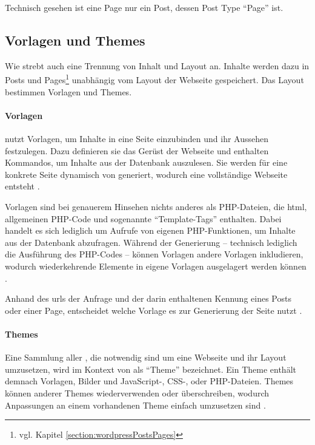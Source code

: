             Technisch gesehen ist eine Page nur ein Post,
            dessen Post Type "`Page"' ist.

        \subsection{Vorlagen und Themes}
            \label{section:wordpressTemplatesThemes}
            Wie {\imperia} strebt auch {\wordpress} eine Trennung von
            Inhalt und Layout an.
            Inhalte werden dazu in
            Posts und Pages\footnote{vgl. Kapitel \ref{section:wordpressPostsPages}}
            unabhängig vom Layout der Webseite gespeichert.
            Das Layout bestimmen Vorlagen und Themes.

            \paragraph*{Vorlagen}
            {\wordpress} nutzt Vorlagen, um Inhalte in eine Seite einzubinden
            und ihr Aussehen festzulegen.
            Dazu definieren sie das Gerüst der Webseite und enthalten Kommandos,
            um Inhalte aus der Datenbank auszulesen.
            Sie werden für eine konkrete Seite dynamisch von {\wordpress} generiert,
            wodurch eine vollständige Webseite entsteht
            \cite{wordpress:Templates}.

            Vorlagen sind bei genauerem Hinsehen nichts anderes als PHP-Dateien,
            die \gls{html}, allgemeinen PHP-Code und sogenannte
            "`Template-Tags"' enthalten.
            Dabei handelt es sich lediglich um Aufrufe von
            {\wordpress} eigenen PHP-Funktionen,
            um Inhalte aus der Datenbank abzufragen.
            Während der Generierung -- technisch lediglich die Ausführung
            des PHP-Codes -- können Vorlagen andere Vorlagen inkludieren,
            wodurch wiederkehrende Elemente in eigene Vorlagen ausgelagert
            werden können \cite{wordpress:TemplateFiles}.

            Anhand des \glspl{url} der Anfrage und der darin enthaltenen
            Kennung eines Posts oder einer Page,
            entscheidet {\wordpress} welche Vorlage es zur Generierung der Seite nutzt
            \cite{wordpress:TemplateHierarchy}.

            \paragraph*{Themes}
            Eine Sammlung aller {\resources}, die notwendig sind um
            eine Webseite und ihr Layout umzusetzen,
            wird im Kontext von {\wordpress} als "`Theme"' bezeichnet.
            Ein Theme enthält demnach Vorlagen, Bilder und
            JavaScript-, CSS-, oder PHP-Dateien.
            Themes können {\resources} anderer Themes wiederverwenden oder überschreiben,
            wodurch Anpassungen an einem vorhandenen Theme einfach umzusetzen sind
            \cite{wordpress:Themes}.

